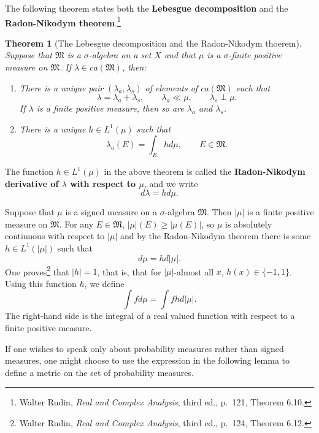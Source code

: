 \documentclass{article}
\newtheorem{theorem}{Theorem}
\theoremstyle{definition}
\begin{document}
The following theorem states both the \textbf{Lebesgue decomposition} and the \textbf{Radon-Nikodym theorem}.\footnote{Walter Rudin, {\em Real and Complex Analysis}, third ed.,
p.~121, Theorem 6.10.} 


\begin{theorem}[The Lebesgue decomposition and the Radon-Nikodym thoerem]
Suppose that $\mathfrak{M}$ is a $\sigma$-algebra on a set $X$ and that $\mu$ is a $\sigma$-finite  positive measure on $\mathfrak{M}$.
If $\lambda \in ca(\mathfrak{M})$, then:
\begin{enumerate}
\item There is a unique pair $(\lambda_a,\lambda_s)$ of elements of $ca(\mathfrak{M})$ such that
\[
\lambda=\lambda_a+\lambda_s, \qquad \lambda_a \ll \mu, \qquad \lambda_s \perp \mu.
\]
If $\lambda$ is a finite positive measure, then so are $\lambda_a$ and $\lambda_s$.
\item There is a unique $h \in L^1(\mu)$ such that
\[
\lambda_a(E) = \int_E h d\mu, \qquad E \in \mathfrak{M}.
\]
\end{enumerate}
\end{theorem}

The function $h \in L^1(\mu)$  in the above theorem is called the \textbf{Radon-Nikodym derivative of $\lambda$ with respect to $\mu$}, and we write
\[
d\lambda = h d\mu.
\]

Suppose that $\mu$ is a signed measure on a $\sigma$-algebra $\mathfrak{M}$. Then $|\mu|$ is a finite positive measure on $\mathfrak{M}$. For any $E \in
\mathfrak{M}$, $|\mu|(E) \geq |\mu(E)|$, so $\mu$ is absolutely continuous with respect to $|\mu|$ and by the Radon-Nikodym theorem there is some
$h \in L^1(|\mu|)$ such that
\[
d\mu = h d|\mu|.
\]
One proves\footnote{Walter Rudin, {\em Real and Complex Analysis}, third ed., p.~124, Theorem 6.12.} that $|h|=1$, that is, that for $|\mu|$-almost all $x$, $h(x) \in \{-1,1\}$.
Using this function $h$, we define
\[
\int f d\mu = \int fh d|\mu|.
\]
The right-hand side is the integral of a real valued function with respect to a finite positive measure.


If one wishes to speak only about probability measures rather than signed measures, one might choose to use the expression in the following lemma to define a metric on the set of probability measures.
\end{document}

